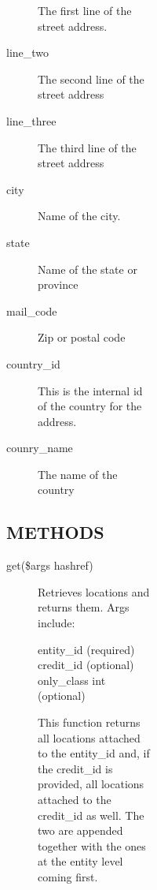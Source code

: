 \begin{description}
\begin{description}
\begin{description}
\begin{description}
\begin{description}
\begin{description}
\begin{description}
\begin{description}
\begin{description}
The first line of the street address.


\item[{line\_two}] \mbox{}

The second line of the street address


\item[{line\_three}] \mbox{}

The third line of the street address


\item[{city}] \mbox{}

Name of the city.


\item[{state}] \mbox{}

Name of the state or province


\item[{mail\_code}] \mbox{}

Zip or postal code


\item[{country\_id}] \mbox{}

This is the internal id of the country for the address.


\item[{counry\_name}] \mbox{}

The name of the country

\end{description}
\subsection*{METHODS\label{LedgerSMB::DBObject::Entity::Location_METHODS}}
\begin{description}

\item[{get(\$args hashref)}] \mbox{}

Retrieves locations and returns them.  Args include:

\begin{description}

\item[{entity\_id (required)}] \mbox{}
\item[{credit\_id (optional)}] \mbox{}
\item[{only\_class int (optional)}] \mbox{}\end{description}


This function returns all locations attached to the entity\_id and, if the credit\_id is provided, all locations attached to the credit\_id as well.  The two 
are appended together with the ones at the entity level coming first.




\end{description}
\end{description}
\end{description}
\end{description}
\end{description}
\end{description}
\end{description}
\end{description}
\end{description}
